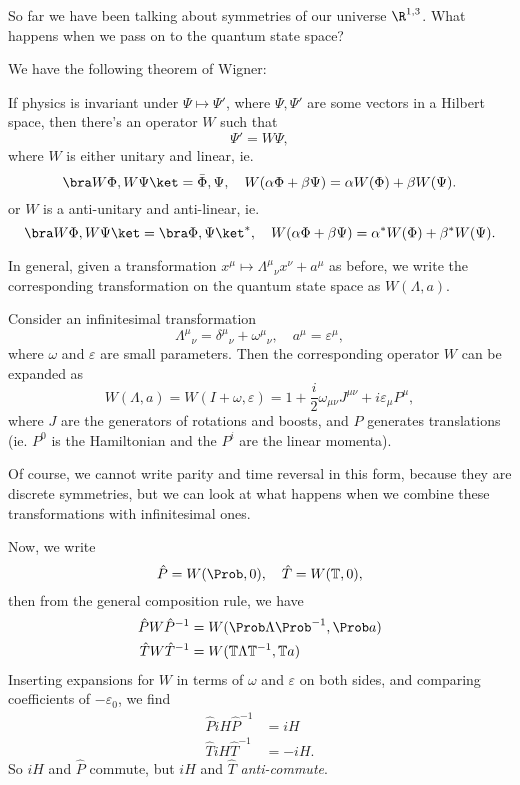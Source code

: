 \documentclass[a4paper]{article}
\begin{document}
So far we have been talking about symmetries of our universe $\R^{1, 3}$. What happens when we pass on to the quantum state space?

We have the following theorem of Wigner:
\begin{thm}[Wigner]
  If physics is invariant under $\Psi \mapsto \Psi'$, where $\Psi, \Psi'$ are some vectors in a Hilbert space, then there's an operator $W$ such that
  \[
    \Psi' = W \Psi,
  \]
  where $W$ is either unitary and linear, ie.
  \[
    \bra W \Phi, W \Psi\ket = \bar \Phi, \Psi,\quad W(\alpha \Phi + \beta \Psi) = \alpha W(\Phi) + \beta W(\Psi).
  \]
  or $W$ is a anti-unitary and anti-linear, ie.
  \[
    \bra W \Phi, W \Psi\ket = \bra \Phi, \Psi\ket^*,\quad W(\alpha \Phi + \beta \Psi) = \alpha^* W(\Phi) + \beta^* W(\Psi).
  \]
\end{thm}

In general, given a transformation $x^\mu \mapsto \Lambda^\mu\!_\nu x^\nu + a^\mu$ as before, we write the corresponding transformation on the quantum state space as $W(\Lambda, a)$.

Consider an infinitesimal transformation
\[
  \Lambda^\mu\!_\nu = \delta^\mu\!_\nu + \omega^\mu\!_\nu,\quad a^\mu = \varepsilon^\mu,
\]
where $\omega$ and $\varepsilon$ are small parameters. Then the corresponding operator $W$ can be expanded as
\[
  W(\Lambda, a) = W(I + \omega, \varepsilon) = 1 + \frac{i}{2} \omega_{\mu\nu} J^{\mu\nu} + i \varepsilon_\mu P^\mu,
\]
where $J$ are the generators of rotations and boosts, and $P$ generates translations (ie. $P^0$ is the Hamiltonian and the $P^i$ are the linear momenta).

Of course, we cannot write parity and time reversal in this form, because they are discrete symmetries, but we can look at what happens when we combine these transformations with infinitesimal ones.

Now, we write
\[
  \hat{P} = W(\Prob, 0),\quad \hat{T} = W(\mathbb{T}, 0),
\]
then from the general composition rule, we have
\begin{align*}
  \hat{P} W \hat{P}^{-1} &= W(\Prob \Lambda \Prob^{-1}, \Prob a)\\
  \hat{T} W \hat{T}^{-1} &= W(\mathbb{T} \Lambda \mathbb{T}^{-1}, \mathbb{T} a)
\end{align*}
Inserting expansions for $W$ in terms of $\omega$ and $\varepsilon$ on both sides, and comparing coefficients of $- \varepsilon_0$, we find
\begin{align*}
  \hat{P} i H \hat{P}^{-1} &= iH\\
  \hat{T} iH \hat{T}^{-1} &= -iH.
\end{align*}
So $iH$ and $\hat{P}$ commute, but $iH$ and $\hat{T}$ \emph{anti-commute}.
\end{document}
